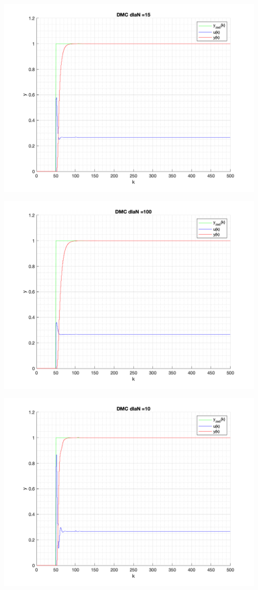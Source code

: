 \documentclass[a4paper, 11pt]{article}
\begin{document}
\begin{enumerate}
 \includegraphics[width=\linewidth]{./ModelsP4_N/P4_DMC_N_15_png.png} 
 
 \includegraphics[width=\linewidth]{./ModelsP4_N/P4_DMC_N_100_png.png} 
 
 \includegraphics[width=\linewidth]{./ModelsP4_N/P4_DMC_N_10_png.png} 
 

\end{enumerate}
\end{document}
